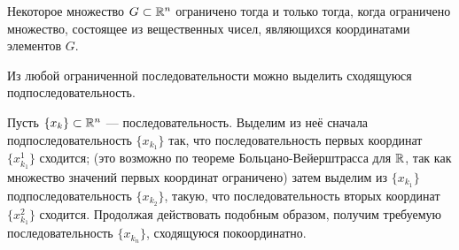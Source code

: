 \begin{sledstvie}
Некоторое множество $G\subset\mathbb{R}^n$ ограничено тогда и только тогда, когда ограничено множество, состоящее из вещественных чисел, являющихся координатами элементов $G$.
\end{sledstvie}

\begin{teorema}
Из любой ограниченной последовательности можно выделить сходящуюся подпоследовательность.
\end{teorema}
\dokvo
Пусть $\{x_k\}\subset\mathbb{R}^n$ --- последовательность.
Выделим из неё сначала подпоследовательность $\{x_{k_1}\}$ так, что последовательность первых координат $\{x_{k_1}^1\}$ сходится;
(это возможно по теореме Больцано-Вейерштрасса для $\mathbb{R}$, так как множество значений первых координат ограничено)
затем выделим из $\{x_{k_1}\}$ подпоследовательность $\{x_{k_2}\}$, такую, что последовательность вторых координат $\{x_{k_1}^2\}$ сходится.
Продолжая действовать подобным образом, получим требуемую последовательность $\{x_{k_n}\}$, сходящуюся покоординатно.
\dokno
